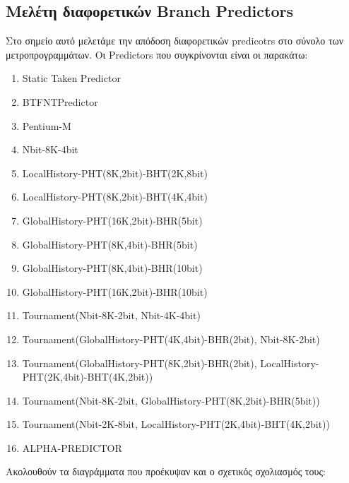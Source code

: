 \newpage
\subsection{Μελέτη διαφορετικών Branch Predictors}
\vspace{3mm}

Στο σημείο αυτό μελετάμε την απόδοση διαφορετικών predicotrs στο σύνολο των
μετροπρογραμμάτων. Οι Predictors που συγκρίνονται είναι οι παρακάτω:

\begin{flushleft}
\begin{enumerate}
   \item Static Taken Predictor
   \item BTFNTPredictor
   \item Pentium-M
   \item Nbit-8K-4bit 
   \item LocalHistory-PHT(8K,2bit)-BHT(2K,8bit)
   \item LocalHistory-PHT(8K,2bit)-BHT(4K,4bit)
   \item GlobalHistory-PHT(16K,2bit)-BHR(5bit)
   \item GlobalHistory-PHT(8K,4bit)-BHR(5bit)
   \item GlobalHistory-PHT(8K,4bit)-BHR(10bit)
   \item GlobalHistory-PHT(16K,2bit)-BHR(10bit)
   \item Tournament(Nbit-8K-2bit, Nbit-4K-4bit)
   \item Tournament(GlobalHistory-PHT(4K,4bit)-BHR(2bit), Nbit-8K-2bit)
   \item Tournament(GlobalHistory-PHT(8K,2bit)-BHR(2bit), LocalHistory-PHT(2K,4bit)-BHT(4K,2bit))
   \item Tournament(Nbit-8K-2bit, GlobalHistory-PHT(8K,2bit)-BHR(5bit))
   \item Tournament(Nbit-2K-8bit, LocalHistory-PHT(2K,4bit)-BHT(4K,2bit))
   \item ALPHA-PREDICTOR
\end{enumerate}
\end{flushleft}

\vspace{1em}    
Ακολουθούν τα διαγράμματα που προέκυψαν και ο σχετικός σχολιασμός
τους:
\vspace{1em}    


